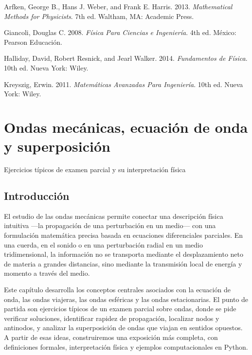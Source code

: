 \documentclass[
  letterpaper,
  DIV=11,
  numbers=noendperiod]{scrreprt}
\newlength{\cslhangindent}
\newenvironment{CSLReferences}[2] %
 {\begin{list}{}{%
  \setlength{\itemindent}{0pt}
  \setlength{\leftmargin}{0pt}
  \setlength{\parsep}{0pt}
  \ifodd #1
   \setlength{\leftmargin}{\cslhangindent}
   \setlength{\itemindent}{-1\cslhangindent}
  \fi
  \setlength{\itemsep}{#2\baselineskip}}}
 {\end{list}}
\begin{document}
\label{refs}
\begin{CSLReferences}{1}{0}
Arfken, George B., Hans J. Weber, and Frank E. Harris. 2013.
\emph{Mathematical Methods for Physicists}. 7th ed. Waltham, MA:
Academic Press.

Giancoli, Douglas C. 2008. \emph{Física Para Ciencias e Ingeniería}. 4th
ed. México: Pearson Educación.

Halliday, David, Robert Resnick, and Jearl Walker. 2014.
\emph{Fundamentos de Física}. 10th ed. Nueva York: Wiley.

Kreyszig, Erwin. 2011. \emph{Matemáticas Avanzadas Para Ingeniería}.
10th ed. Nueva York: Wiley.

\end{CSLReferences}

\chapter{Ondas mecánicas, ecuación de onda y
superposición}\label{ondas-mecuxe1nicas-ecuaciuxf3n-de-onda-y-superposiciuxf3n}

Ejercicios típicos de examen parcial y su interpretación física

\hfill\break

\section{Introducción}\label{introducciuxf3n-1}

El estudio de las ondas mecánicas permite conectar una descripción
física intuitiva ---la propagación de una perturbación en un medio---
con una formulación matemática precisa basada en ecuaciones
diferenciales parciales. En una cuerda, en el sonido o en una
perturbación radial en un medio tridimensional, la información no se
transporta mediante el desplazamiento neto de materia a grandes
distancias, sino mediante la transmisión local de energía y momento a
través del medio.

Este capítulo desarrolla los conceptos centrales asociados con la
ecuación de onda, las ondas viajeras, las ondas esféricas y las ondas
estacionarias. El punto de partida son ejercicios típicos de un examen
parcial sobre ondas, donde se pide verificar soluciones, identificar
rapidez de propagación, localizar nodos y antinodos, y analizar la
superposición de ondas que viajan en sentidos opuestos. A partir de esas
ideas, construiremos una exposición más completa, con definiciones
formales, interpretación física y ejemplos computacionales en Python.
\end{document}
